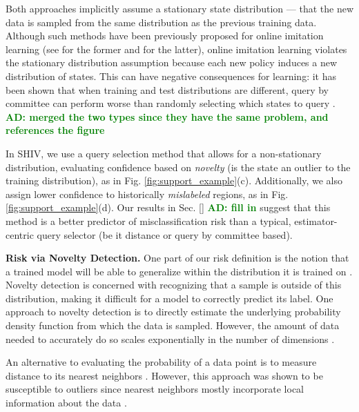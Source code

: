 \documentclass[10pt, conference]{ieeeconf}      %
\newcommand{\adnote}[1]{\ifthenelse{\boolean{include-notes}}%
 {\textcolor{green}{\textbf{AD: #1}}}{}}
\begin{document}
Both approaches implicitly assume a stationary state distribution --- that the new data is sampled from the same distribution as the previous training data. Although such methods have been previously proposed for online imitation learning (see \cite{chernova2009interactive,grollman2007dogged} for the former and \cite{judah2011active,judah2012active} for the latter),
online imitation learning violates the stationary distribution assumption because each new policy induces a new distribution of states. This can have negative consequences for learning: it has been shown that when training and test distributions are different, query by committee can perform worse than randomly selecting  which states to query \cite{burbidge2007active}.\adnote{merged the two types since they have the same problem, and references the figure}


In SHIV, we use a query selection method that allows for a non-stationary distribution, evaluating confidence based on \emph{novelty} (is the state an outlier to the training distribution), as in Fig. \ref{fig:support_example}(c). Additionally, we also assign lower confidence to  historically \emph{mislabeled} regions, as in Fig. \ref{fig:support_example}(d). %
Our results in Sec. \ref{}\adnote{fill in} suggest that this method is a better predictor of misclassification risk than a typical, estimator-centric query selector (be it distance or query by committee based).


\noindent\textbf{Risk via Novelty Detection.}
One part of our risk definition is the notion that a trained model will be able to generalize within the distribution it is
trained on \cite{tokdar2010importance}. Novelty detection \cite{hodge2004survey} is concerned with recognizing that a sample is outside of this distribution, making it difficult for a model to correctly predict its label.
One approach to novelty detection is to directly estimate the underlying probability density function from which the data is sampled. However, the amount of data needed to accurately do so scales exponentially in the number of dimensions \cite{nadaraya1964estimating}.

An alternative to evaluating the probability of a data point is to measure distance to its nearest neighbors \cite{knox1998algorithms}. However, this approach was shown to be
susceptible to outliers since nearest neighbors mostly incorporate local information about the data \cite{hodge2004survey}.
\end{document}
